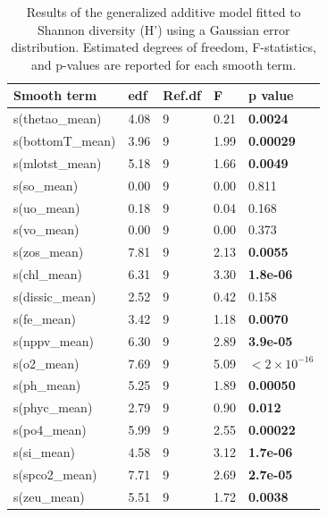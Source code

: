 \documentclass[a4paper,fleqn]{cas-sc}
\begin{document}
\begin{table}[width=\linewidth,cols=5,pos=!htbp]
\caption{Results of the generalized additive model fitted to Shannon diversity (H') using a Gaussian error distribution. Estimated degrees of freedom, F-statistics, and p-values are reported for each smooth term.}
\begin{tabular*}{\tblwidth}{@{} LLLLL @{}}
\toprule
\textbf{Smooth term} & \textbf{edf} & \textbf{Ref.df} & \textbf{F} & \textbf{p value} \\
\midrule
s(thetao\_mean)      & 4.08 & 9 & 0.21 & \textbf{0.0024} \\
s(bottomT\_mean) & 3.96 & 9 & 1.99 & \textbf{0.00029} \\
s(mlotst\_mean)   & 5.18 & 9 & 1.66 & \textbf{0.0049} \\
s(so\_mean)       & 0.00 & 9 & 0.00 & 0.811 \\
s(uo\_mean)       & 0.18 & 9 & 0.04 & 0.168 \\
s(vo\_mean)       & 0.00 & 9 & 0.00 & 0.373 \\
s(zos\_mean)      & 7.81 & 9 & 2.13 & \textbf{0.0055} \\
s(chl\_mean)      & 6.31 & 9 & 3.30 & \textbf{1.8e-06} \\
s(dissic\_mean)   & 2.52 & 9 & 0.42 & 0.158 \\
s(fe\_mean)       & 3.42 & 9 & 1.18 & \textbf{0.0070} \\
s(nppv\_mean)     & 6.30 & 9 & 2.89 & \textbf{3.9e-05} \\
s(o2\_mean)       & 7.69 & 9 & 5.09 & \textbf{$<2 \times 10^{-16}$} \\
s(ph\_mean)       & 5.25 & 9 & 1.89 & \textbf{0.00050} \\
s(phyc\_mean)     & 2.79 & 9 & 0.90 & \textbf{0.012} \\
s(po4\_mean)      & 5.99 & 9 & 2.55 & \textbf{0.00022} \\
s(si\_mean)       & 4.58 & 9 & 3.12 & \textbf{1.7e-06} \\
s(spco2\_mean)    & 7.71 & 9 & 2.69 & \textbf{2.7e-05} \\
s(zeu\_mean)      & 5.51 & 9 & 1.72 & \textbf{0.0038} \\
\bottomrule
\end{tabular*}
\label{tab:11}
\end{table}
\end{document}
